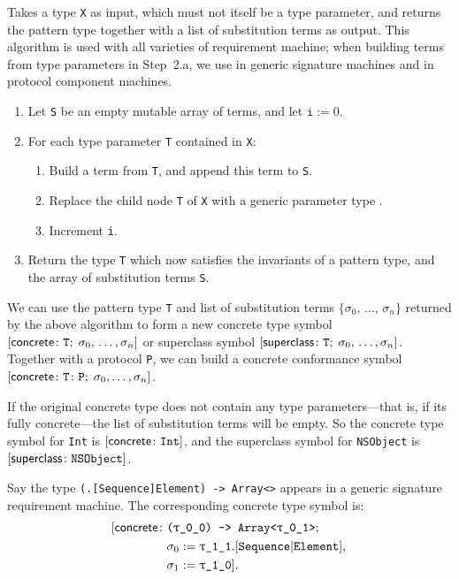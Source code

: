 \documentclass[../generics]{subfiles}
\begin{document}
\begin{algorithm}\label{concretesymbolcons}
Takes a type \texttt{X} as input, which must not itself be a type parameter, and returns the pattern type together with a list of substitution terms as output. This algorithm is used with all varieties of requirement machine; when building terms from type parameters in Step~2.a, we use  in generic signature machines and  in protocol component machines.
\begin{enumerate}
\item Let \texttt{S} be an empty mutable array of terms, and let $\texttt{i}:=0$.
\item For each type parameter \texttt{T} contained in \texttt{X}:
\begin{enumerate}
\item Build a term from \texttt{T}, and append this term to \texttt{S}.
\item Replace the child node \texttt{T} of \texttt{X} with a generic parameter type .
\item Increment \texttt{i}.
\end{enumerate}
\item Return the type \texttt{T} which now satisfies the invariants of a pattern type, and the array of substitution terms \texttt{S}.
\end{enumerate}
\end{algorithm}
We can use the pattern type \texttt{T} and list of substitution terms $\{\sigma_0,\,\ldots,\,\sigma_n\}$ returned by the above algorithm to form a new concrete type symbol $[\mathsf{concrete}\colon \texttt{T};\;\sigma_0,\,\ldots,\sigma_n]$ or superclass symbol $[\mathsf{superclass}\colon \texttt{T};\;\sigma_0,\,\ldots,\sigma_n]$. Together with a protocol \texttt{P}, we can build a concrete conformance symbol $[\mathsf{concrete}\colon \texttt{T}\colon\texttt{P};\;\sigma_0,\ldots,\sigma_n]$.
\begin{example}
If the original concrete type does not contain any type parameters---that is, if its fully concrete---the list of substitution terms will be empty. So the concrete type symbol for \texttt{Int} is $[\mathsf{concrete}\colon \texttt{Int}]$, and the superclass symbol for \texttt{NSObject} is $[\mathsf{superclass}\colon \texttt{NSObject}]$.
\end{example}
\begin{example}
Say the type \texttt{(.[Sequence]Element) -> Array<>} appears in a generic signature requirement machine. The corresponding concrete type symbol is:
\begin{align*}
\concretesym{&\texttt{(\ttgp{0}{0}) -> Array<\ttgp{0}{1}>};\;\\
&\sigma_0 := \ttgp{1}{1}.\assocsym{Sequence}{Element},\,\\
&\sigma_1 := \ttgp{1}{0}}.
\end{align*}
\end{example}
\end{document}
